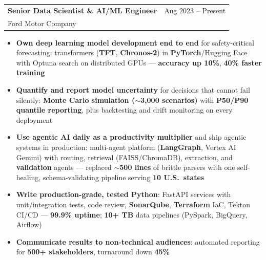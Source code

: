 \documentclass[10.5pt,letterpaper]{article}
\makeatletter
\newcommand{\cventry}[5]{%
  \noindent\begin{tabularx}{\textwidth}{@{}X r@{}}
    {\bfseries\color{headerblue}#2} & {\color{graytext}#1} \\
    {\color{accentcolor}#3}\enskip{\color{lightgray}#4} & \\
  \end{tabularx}%
  \vspace{0.02em}%
  #5%
  \vspace{0.05em}%
}
\makeatother
\begin{document}
\cventry{Aug 2023 -- Present}{Senior Data Scientist \& AI/ML Engineer}{Ford Motor Company}{Detroit, MI (Remote)}{
\begin{itemize}[leftmargin=0.4cm, itemsep=0.02cm, topsep=0.04cm, label={\color{goldaccent}\textbullet}]
  \item \textbf{Own deep learning model development end to end} for safety-critical forecasting: transformers (\textbf{TFT}, \textbf{Chronos-2}) in \textbf{PyTorch}/Hugging Face with Optuna search on distributed GPUs --- \textbf{accuracy up 10\%}, \textbf{40\% faster training}
  \item \textbf{Quantify and report model uncertainty} for decisions that cannot fail silently: \textbf{Monte Carlo simulation ($\sim$3{,}000 scenarios)} with \textbf{P50/P90 quantile reporting}, plus backtesting and drift monitoring on every deployment
  \item \textbf{Use agentic AI daily as a productivity multiplier} and ship agentic systems in production: multi-agent platform (\textbf{LangGraph}, Vertex AI Gemini) with routing, retrieval (FAISS/ChromaDB), extraction, and \textbf{validation} agents --- replaced $\sim$\textbf{500 lines} of brittle parsers with one self-healing, schema-validating pipeline serving \textbf{10 U.S.\ states}
  \item \textbf{Write production-grade, tested Python}: FastAPI services with unit/integration tests, code review, \textbf{SonarQube}, \textbf{\mbox{Terraform}} IaC, Tekton CI/CD --- \textbf{99.9\% uptime}; \textbf{10+ TB} data pipelines (PySpark, BigQuery, Airflow)
  \item \textbf{Communicate results to non-technical audiences}: automated reporting for \textbf{500+ stakeholders}, turnaround down \textbf{45\%}
\end{itemize}
}
\end{document}
